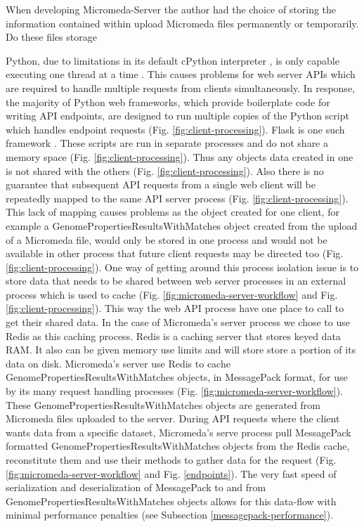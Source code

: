 When developing Micromeda-Server the author had the choice of storing the information contained within upload Micromeda files permanently or temporarily. Do these files storage 

Python, due to limitations in its default cPython interpreter \cite{van1995python}, is only capable executing one thread at a time \cite{beazley2010understanding}. This causes problems for web server APIs which are required to handle multiple requests from clients simultaneously. In response, the majority of Python web frameworks, which provide boilerplate code for writing API endpoints, are designed to run multiple copies of the Python script which handles endpoint requests (Fig. \ref{fig:client-processing}). Flask is one such framework \cite{grinberg2018flask}. These scripts are run in separate processes and do not share a memory space (Fig. \ref{fig:client-processing}). Thus any objects data created in one is not shared with the others (Fig. \ref{fig:client-processing}). Also there is no guarantee that subsequent API requests from a single web client will be repeatedly mapped to the same API server process (Fig. \ref{fig:client-processing}). This lack of mapping causes problems as the object created for one client, for example a GenomePropertiesResultsWithMatches object created from the upload of a Micromeda file, would only be stored in one process and would not be available in other process that future client requests may be directed too (Fig. \ref{fig:client-processing}). One way of getting around this process isolation issue is to store data that needs to be shared between web server processes in an external process which is used to cache (Fig. \ref{fig:micromeda-server-workflow} and Fig. \ref{fig:client-processing}). This way the web API process have one place to call to get their shared data. In the case of Micromeda's server process we chose to use Redis as this caching process. Redis is a caching server that stores keyed data RAM. It also can be given memory use limits and will store store a portion of its data on disk. Micromeda's server use Redis to cache GenomePropertiesResultsWithMatches objects, in MessagePack format, for use by its many request handling processes (Fig. \ref{fig:micromeda-server-workflow}). These GenomePropertiesResultsWithMatches objects are generated from Micromeda files uploaded to the server. During API requests where the client wants data from a specific dataset, Micromeda's serve process pull MessagePack formatted GenomePropertiesResultsWithMatches objects from the Redis cache, reconstitute them and use their methods to gather data for the request (Fig. \ref{fig:micromeda-server-workflow}  and Fig. \ref{endpoints}). The very fast speed of serialization and deserialization of MessagePack to and from GenomePropertiesResultsWithMatches objects allows for this data-flow with minimal performance penalties (see Subsection \ref{messagepack-performance}).

